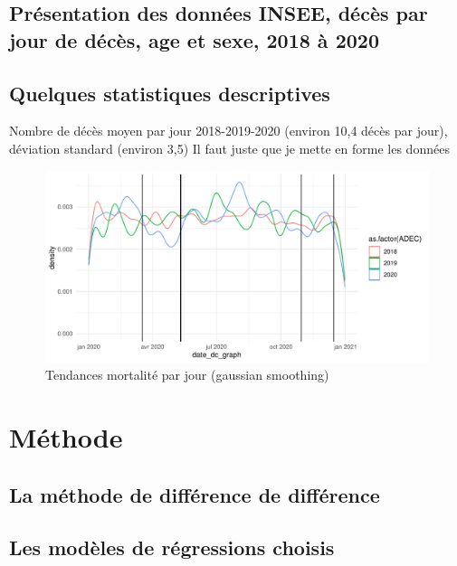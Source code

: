 \documentclass{article}
\begin{document}
\subsection{Présentation des données INSEE, décès par jour de décès, age et sexe, 2018 à 2020}




\subsection{Quelques statistiques descriptives}





Nombre de décès moyen par jour 2018-2019-2020 (environ 10,4 décès par jour), déviation standard (environ 3,5)
Il faut juste que je mette en forme les données


\begin{center}
\begin{figure}[h!]
\caption{\label{Graph_descr}Tendances mortalité par jour (gaussian smoothing)}
\includegraphics{Aussant_Forcadell_Sessego-003}
\end{figure}
\end{center}








\section{Méthode}

\subsection{La méthode de différence de différence}


\subsection{Les modèles de régressions choisis}
\end{document}
